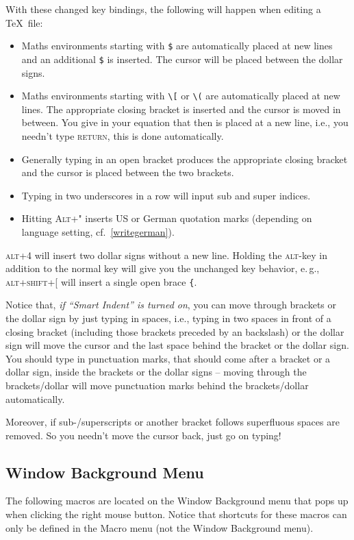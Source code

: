 \documentclass{article}
\newcommand{\keyname}[1]{\textsc{#1}}
\begin{document}
With these changed key bindings, the following will happen when editing a \TeX\ file:

\begin{itemize} 
\item Maths environments starting with \verb|$| are automatically placed at new lines and an additional \verb|$| is inserted. The cursor will be placed between the dollar signs.
\item Maths environments starting with \verb|\[| or \verb|\(| are automatically placed at new lines. The appropriate closing bracket is inserted and the cursor is moved in between. You give in your equation that then is placed at a new line, i.e., you needn't type \keyname{return}, this is done automatically.
\item Generally typing in an open bracket produces the appropriate closing bracket and the cursor is placed between the two brackets.
\item Typing in two underscores in a row will input sub and super indices.
\item Hitting \keyname{Alt+"} inserts US or German quotation marks (depending on language setting, cf.~\ref{writegerman}). 
\end{itemize}

\keyname{alt+4} will insert two dollar signs without a new line. Holding the \keyname{alt}-key in addition to the normal key will give you the unchanged key behavior, e.\,g., \keyname{alt+shift+[} will insert a single open brace \verb|{|. 

Notice that, \emph{if ``Smart Indent'' is turned on}, you can move through brackets or the dollar sign by just typing in spaces, i.e., typing in two spaces in front of a closing bracket (including those brackets preceded by an backslash) or the dollar sign will move the cursor and the last space behind the bracket or the dollar sign. You should type in punctuation marks, that should come after a bracket or a dollar sign, inside the brackets or the dollar signs -- moving through the brackets/dollar will move punctuation marks behind the brackets/dollar automatically. 

Moreover, if sub-/superscripts or another bracket follows superfluous spaces are removed. So you needn't move the cursor back, just go on typing!


\subsection{Window Background Menu} 
The following macros are located on the Window Background menu that pops up when  clicking the right mouse button. Notice that shortcuts for these macros can only be defined in the Macro menu (not the Window Background menu).
\end{document}
